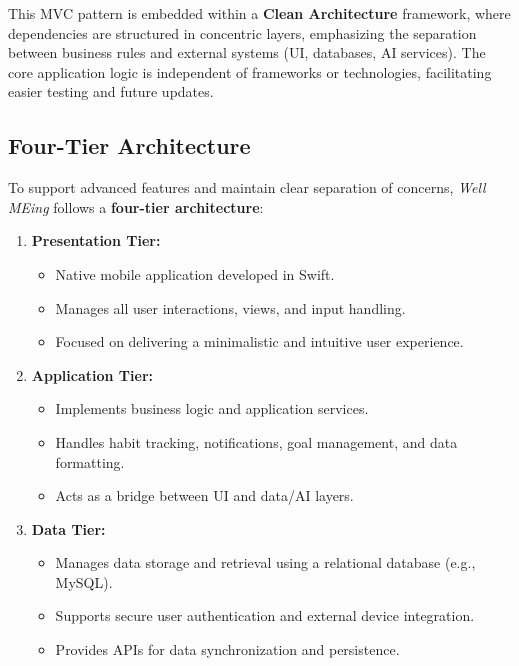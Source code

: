 \documentclass{article}
\begin{document}
This MVC pattern is embedded within a \textbf{Clean Architecture} framework, where dependencies are structured in concentric layers, emphasizing the separation between business rules and external systems (UI, databases, AI services). The core application logic is independent of frameworks or technologies, facilitating easier testing and future updates.

\subsection{Four-Tier Architecture}

To support advanced features and maintain clear separation of concerns, \textit{Well MEing} follows a \textbf{four-tier architecture}:

\begin{enumerate}
    \item \textbf{Presentation Tier:}
    \begin{itemize}
        \item Native mobile application developed in Swift.
        \item Manages all user interactions, views, and input handling.
        \item Focused on delivering a minimalistic and intuitive user experience.
    \end{itemize}

    \item \textbf{Application Tier:}
    \begin{itemize}
        \item Implements business logic and application services.
        \item Handles habit tracking, notifications, goal management, and data formatting.
        \item Acts as a bridge between UI and data/AI layers.
    \end{itemize}

    \item \textbf{Data Tier:}
    \begin{itemize}
        \item Manages data storage and retrieval using a relational database (e.g., MySQL).
        \item Supports secure user authentication and external device integration.
        \item Provides APIs for data synchronization and persistence.
    \end{itemize}


\end{enumerate}
\end{document}
